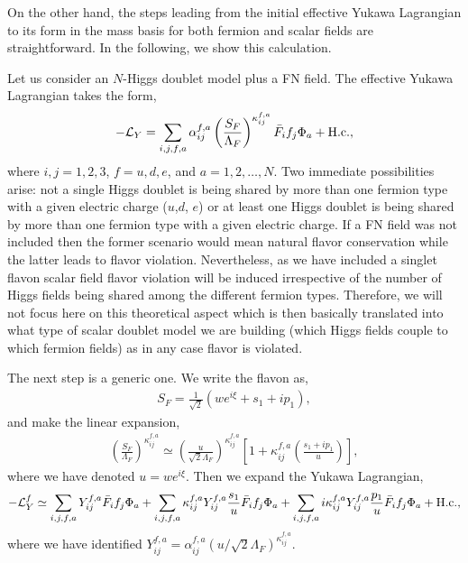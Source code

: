 \documentclass[aps,prd,groupaddress,floatfix,tighten,nofootinbib,showpacs,
amsfonts,superscriptaddress]{revtex4}
\begin{document}
On the other hand, the steps leading from the initial effective Yukawa Lagrangian to its form in the mass basis for both fermion and scalar fields are straightforward. In the following, we show this calculation. 

Let us consider an $N$-Higgs doublet model plus a FN field. The effective Yukawa Lagrangian takes the form,
	\begin{eqnarray}
		-{\cal L}_Y = \sum_{i,j,f,a} \alpha^{f,a}_{ij} \left( \frac{S_F}{\Lambda_F} \right)^{\kappa^{f,a}_{ij}}
		\bar{F}_{i} f_j {\Phi_a} + {\textrm{H.c.}},
	\end{eqnarray} 
where $i,j =1,2,3$, $f=u,d,e$, and $a=1,2,\dots,N$.	
Two immediate possibilities arise: not a single Higgs doublet is being shared by more than one fermion type with a 
given electric charge ($u$,$d$, $e$) or at least one Higgs doublet is being shared by more than one fermion 
type with a given electric charge. If a FN field was not included
then the former scenario would mean natural flavor conservation while the latter leads to flavor violation. 
Nevertheless, as we have included a singlet flavon scalar field flavor violation will be induced irrespective 
of the number of Higgs fields being shared among the different fermion types. Therefore, we will not focus 
here on this theoretical aspect which is then basically translated into what type of scalar doublet 
model we are building (which Higgs fields couple to which fermion fields) as in any case flavor is violated. 

The next step is a generic one. We write the flavon as, 
\begin{eqnarray}
 S_F = \frac{1}{\sqrt{2}} ({w} e^{i\xi}  + s_1 + i p_1 ),
\end{eqnarray}
and make the linear expansion,
\begin{eqnarray}
\left( \frac{S_F}{\Lambda_F} \right)^{\kappa^{f,a}_{ij}} \simeq 
\left( \frac{u}{\sqrt{2}\Lambda_F} \right)^{\kappa_{ij}^{f,a}} \left[ 1 +\kappa_{ij}^{f,a} \left( \frac{s_1 + i p_1}{u} \right)  \right],
\end{eqnarray} 
where we have denoted $u= w e^{i \xi}$. Then we expand the Yukawa Lagrangian,
	\begin{eqnarray}
		-{\cal L}_Y^f \simeq \sum_{i,j,f,a} Y^{f,a}_{ij} 
		\bar{F}_{i} f_j \Phi_a + \sum_{i,j,f,a} \kappa_{ij}^{f,a} Y_{ij}^{f,a} \frac{s_1}{u} \bar{F}_{i} f_j \Phi_a
		+ \sum_{i,j,f,a} i \kappa_{ij}^{f,a} Y_{ij}^{f,a} \frac{p_1}{u} \bar{F}_{i} f_j \Phi_a + {\textrm{H.c.}},
	\end{eqnarray}
where we have identified
	$Y_{ij}^{f,a} = \alpha_{ij}^{f,a} (u/ \sqrt{2}\Lambda_F)^{\kappa_{ij}^{f,a}}$. 
	
\end{document}
